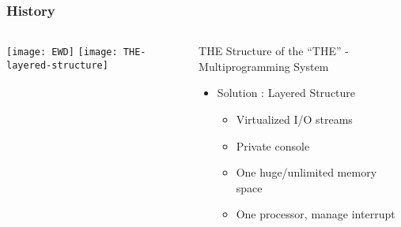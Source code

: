 \begin{frame}[plain]
	\frametitle{History}
	
	
	
	\begin{columns}
		
		\begin{column}{.4\textwidth}
			\centering
			\texttt{[image: EWD]}
			\texttt{[image: THE-layered-structure]}
			
			
			
		\end{column}
		
		\begin{column}{.6\textwidth}
			
			THE Structure of the “THE” - Multiprogramming System
			\begin{itemize}
				\item Solution : Layered Structure
				
				\begin{itemize}
					\item Virtualized I/O streams
					\item Private console
					\item One huge/unlimited memory space
					\item One processor, manage interrupt
				\end{itemize}
				
			\end{itemize}	
			
		\end{column}
		
		
	\end{columns}
	
	
\end{frame}


